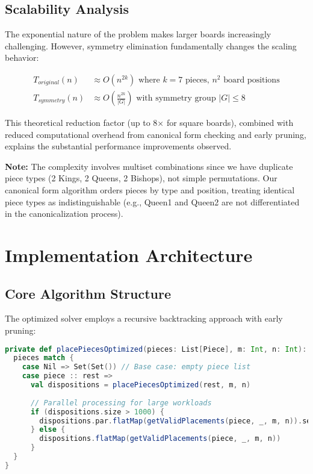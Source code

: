 \documentclass[12pt,a4paper]{article}
\theoremstyle{definition}
\begin{document}
\subsection{Scalability Analysis}

The exponential nature of the problem makes larger boards increasingly challenging. However, symmetry elimination fundamentally changes the scaling behavior:

\begin{align}
T_{original}(n) &\approx O(n^{2k}) \text{ where } k = 7 \text{ pieces, } n^2 \text{ board positions} \\
T_{symmetry}(n) &\approx O\left(\frac{n^{2k}}{|G|}\right) \text{ with symmetry group } |G| \leq 8
\end{align}

This theoretical reduction factor (up to 8× for square boards), combined with reduced computational overhead from canonical form checking and early pruning, explains the substantial performance improvements observed.

\textbf{Note:} The complexity involves multiset combinations since we have duplicate piece types (2 Kings, 2 Queens, 2 Bishops), not simple permutations. Our canonical form algorithm orders pieces by type and position, treating identical piece types as indistinguishable (e.g., Queen1 and Queen2 are not differentiated in the canonicalization process).

\section{Implementation Architecture}

\subsection{Core Algorithm Structure}

The optimized solver employs a recursive backtracking approach with early pruning:

\begin{lstlisting}[language=Scala, caption=Core Solver Logic]
private def placePiecesOptimized(pieces: List[Piece], m: Int, n: Int): Solutions = {
  pieces match {
    case Nil => Set(Set()) // Base case: empty piece list
    case piece :: rest =>
      val dispositions = placePiecesOptimized(rest, m, n)
      
      // Parallel processing for large workloads
      if (dispositions.size > 1000) {
        dispositions.par.flatMap(getValidPlacements(piece, _, m, n)).seq.toSet
      } else {
        dispositions.flatMap(getValidPlacements(piece, _, m, n))
      }
  }
}
\end{lstlisting}
\end{document}

